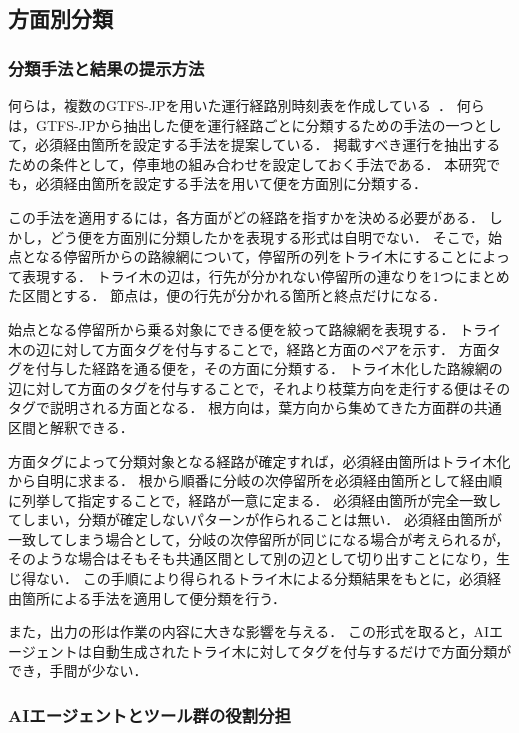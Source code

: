 \subsection{方面別分類}

\subsubsection{分類手法と結果の提示方法}

何らは，複数のGTFS-JPを用いた運行経路別時刻表を作成している~\cite{jscejj.22-00196}．
何らは，GTFS-JPから抽出した便を運行経路ごとに分類するための手法の一つとして，必須経由箇所を設定する手法を提案している．
掲載すべき運行を抽出するための条件として，停車地の組み合わせを設定しておく手法である．
本研究でも，必須経由箇所を設定する手法を用いて便を方面別に分類する．

この手法を適用するには，各方面がどの経路を指すかを決める必要がある．
しかし，どう便を方面別に分類したかを表現する形式は自明でない．
そこで，始点となる停留所からの路線網について，停留所の列をトライ木にすることによって表現する．
トライ木の辺は，行先が分かれない停留所の連なりを1つにまとめた区間とする．
節点は，便の行先が分かれる箇所と終点だけになる．

始点となる停留所から乗る対象にできる便を絞って路線網を表現する．
トライ木の辺に対して方面タグを付与することで，経路と方面のペアを示す．
方面タグを付与した経路を通る便を，その方面に分類する．
トライ木化した路線網の辺に対して方面のタグを付与することで，それより枝葉方向を走行する便はそのタグで説明される方面となる．
根方向は，葉方向から集めてきた方面群の共通区間と解釈できる．


方面タグによって分類対象となる経路が確定すれば，必須経由箇所はトライ木化から自明に求まる．
根から順番に分岐の次停留所を必須経由箇所として経由順に列挙して指定することで，経路が一意に定まる．
必須経由箇所が完全一致してしまい，分類が確定しないパターンが作られることは無い．
必須経由箇所が一致してしまう場合として，分岐の次停留所が同じになる場合が考えられるが，そのような場合はそもそも共通区間として別の辺として切り出すことになり，生じ得ない．
この手順により得られるトライ木による分類結果をもとに，必須経由箇所による手法を適用して便分類を行う．

また，出力の形は作業の内容に大きな影響を与える．
この形式を取ると，AIエージェントは自動生成されたトライ木に対してタグを付与するだけで方面分類ができ，手間が少ない．

\subsubsection{AIエージェントとツール群の役割分担}

